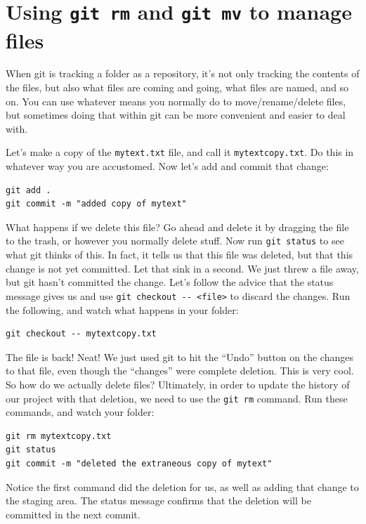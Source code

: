 \documentclass{article}
\begin{document}
\section{Using \texttt{git rm} and \texttt{git mv} to manage files}
\label{sec-7}

When git is tracking a folder as a repository, it's not only tracking the contents of the files, but also what files are coming and going, what files are named, and so on. You can use whatever means you normally do to move/rename/delete files, but sometimes doing that within git can be more convenient and easier to deal with.

Let's make a copy of the \texttt{mytext.txt} file, and call it \texttt{mytextcopy.txt}.  Do this in whatever way you are accustomed.  Now let's add and commit that change:


\begin{verbatim}
git add .
git commit -m "added copy of mytext"
\end{verbatim}

What happens if we delete this file?  Go ahead and delete it by dragging the file to the trash, or however you normally delete stuff.  Now run \texttt{git status} to see what git thinks of this.  In fact, it tells us that this file was deleted, but that this change is not yet committed.  Let that sink in a second.  We just threw a file away, but git hasn't committed the change.  Let's follow the advice that the status message gives us and use \texttt{git checkout -{}- <file>} to discard the changes.  Run the following, and watch what happens in your folder:


\begin{verbatim}
git checkout -- mytextcopy.txt
\end{verbatim}

The file is back! Neat! We just used git to hit the ``Undo'' button on the changes to that file, even though the ``changes'' were complete deletion. This is very cool. So how do we actually delete files?  Ultimately, in order to update the history of our project with that deletion, we need to use the \texttt{git rm} command. Run these commands, and watch your folder:


\begin{verbatim}
git rm mytextcopy.txt
git status
git commit -m "deleted the extraneous copy of mytext"
\end{verbatim}

Notice the first command did the deletion for us, as well as adding that change to the staging area. The status message confirms that the deletion will be committed in the next commit.
\end{document}
